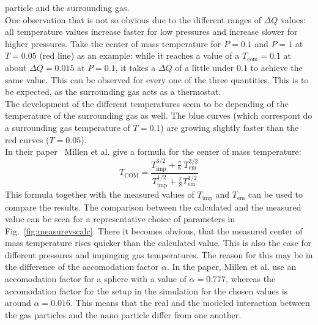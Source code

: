 \documentclass[12pt]{article}
\begin{document}
particle and the surrounding gas.\\
One observation that is not so obvious due to the different ranges of $\Delta Q$ values: all temperature values increase faster for low pressures and
increase slower for higher pressures. Take the center of mass temperature for $P=0.1$ and $P=1$ at $T=0.05$ (red line) as an example: while it reaches
a value of a $T_\text{com} = 0.1$ at about $\Delta Q = 0.015$ at $P=0.1$, it takes a $\Delta Q$ of a little under $0.1$ to achieve the same value.
This can be observed for every one of the three quantities. This is to be expected, as the surrounding gas acts as a thermostat. \\
The development of the different temperatures seem to be depending of the temperature of the surrounding gas as well. The blue curves (which
correspont do a surrounding gas temperature of $T=0.1$) are growing slightly faster than the red curves ($T=0.05$).\\
In their paper~\cite{MillenJ.2014} Millen et al. give a formula for the center of mass temperature:
\begin{equation}
    T_\text{COM} = \frac{T_\text{imp}^{3/2}+\tfrac\pi 8 \ T_\text{em}^{3/2}}{T_\text{imp}^{1/2}+\tfrac\pi8 T_\text{em}^{1/2}}
\end{equation}
This formula together with the measured values of $T_\text{imp}$ and $T_\text{em}$ can be used to compare the results. The comparison between the
calculated and the measured value can be seen for a representative choice of parameters in Fig.~\ref{fig:measurevscalc}. There it becomes obvious,
that the measured center of mass temperature rises quicker than the calculated value. This is also the case for different pressures and impinging gas
temperatures. The reason for this may be in the difference of the accomodation factor $\alpha$. In the paper, Millen et al. use an accomodation factor
for a sphere with a value of $\alpha = 0.777$, whereas the accomodation factor for the setup in the simulation for the chosen values is around
$\alpha = 0.016$. This means that the real and the modeled interaction between the gas particles and the nano particle differ from one another.
\end{document}
